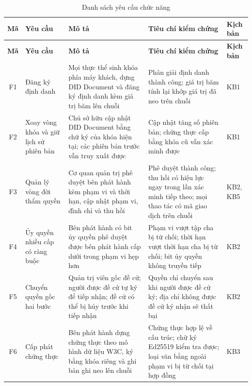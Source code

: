 \begin{longtable}{|c|p{2.6cm}|p{4.4cm}|p{4.8cm}|p{1.3cm}|}
\caption{Danh sách yêu cầu chức năng\label{tab:functional-requirements}} \\
\hline
\textbf{Mã} & \textbf{Yêu cầu} & \textbf{Mô tả} & \textbf{Tiêu chí kiểm chứng} & \textbf{Kịch bản} \\
\hline
\endfirsthead

\hline
\textbf{Mã} & \textbf{Yêu cầu} & \textbf{Mô tả} & \textbf{Tiêu chí kiểm chứng} & \textbf{Kịch bản} \\
\hline
\endhead

\hline
\endfoot

\hline
\endlastfoot

F1 & Đăng ký định danh
& Mọi thực thể sinh khóa phía máy khách, dựng DID Document và đăng ký định danh kèm giá trị băm lên chuỗi
& Phân giải định danh thành công; giá trị băm tính lại khớp giá trị đã neo trên chuỗi
& KB1 \\ \hline

F2 & Xoay vòng khóa và giữ lịch sử phiên bản
& Chủ sở hữu cập nhật DID Document bằng chữ ký của khóa hiện tại; các phiên bản trước vẫn truy xuất được
& Cập nhật tăng số phiên bản; chứng thực cấp bằng khóa cũ vẫn xác minh được
& KB1 \\ \hline

F3 & Quản lý vòng đời thẩm quyền
& Cơ quan quản trị phê duyệt bên phát hành kèm phạm vi và thời hạn, cập nhật phạm vi, đình chỉ và thu hồi
& Phê duyệt thành công; thu hồi có hiệu lực ngay trong lần xác minh tiếp theo; mọi thao tác có mã giao dịch trên chuỗi
& KB2, KB5 \\ \hline

F4 & Ủy quyền nhiều cấp có ràng buộc
& Bên phát hành có bit ủy quyền phê duyệt được bên phát hành cấp dưới trong phạm vi hẹp hơn
& Phạm vi vượt tập cha bị từ chối; thời hạn vượt thời hạn cha bị từ chối; bit ủy quyền không truyền tiếp
& KB2 \\ \hline

F5 & Chuyển quyền gốc hai bước
& Quản trị viên gốc đề cử; người được đề cử tự ký để tiếp nhận; đề cử có thể bị hủy trước khi tiếp nhận
& Quyền chỉ chuyển sau khi người được đề cử ký; địa chỉ không được đề cử ký nhận sẽ thất bại
& KB2 \\ \hline

F6 & Cấp phát chứng thực
& Bên phát hành dựng chứng thực theo mô hình dữ liệu W3C, ký bằng khóa riêng và ghi bản ghi neo lên chuỗi
& Chứng thực hợp lệ về cấu trúc; chữ ký Ed25519 kiểm tra được; loại văn bằng ngoài phạm vi bị từ chối tại hợp đồng
& KB3 \\ \hline


\end{longtable}
